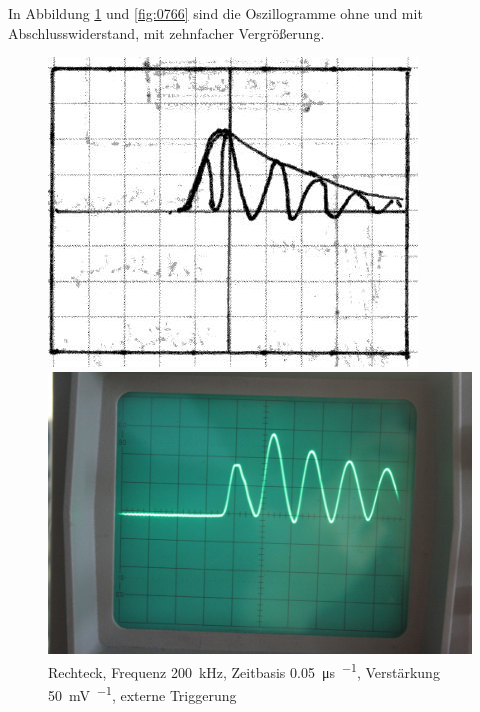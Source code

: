 In Abbildung \ref{fig:0764} und \ref{fig:0766} sind die Oszillogramme ohne und
mit Abschlusswiderstand, mit zehnfacher Vergrößerung.

\begin{figure}
	\centering
	\begin{minipage}{.45\linewidth}
	\includegraphics[width=\linewidth]{Skizzen/IMG_0764-1500.jpg}
	\end{minipage}
	\hfill
	\begin{minipage}{.45\linewidth}
	\includegraphics[width=\linewidth]{Fotos/IMG_0764-1500.jpg}
	\end{minipage}
	\caption{%
		Rechteck, Frequenz \SI{200}{\kilo\hertz},
		Zeitbasis \SI{.05}{\micro\second\per\division},
		Verstärkung \SI{50}{\milli\volt\per\division},
		externe Triggerung
	}
	\label{fig:0764}
\end{figure}

